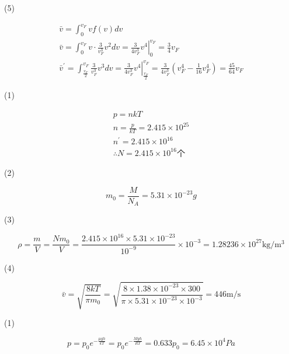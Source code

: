 \documentclass[b5paper,opensource]{./template/qyxf-book}
\begin{document}
(5)

$$
\begin{array} { c } { \bar { v } = \int _ { 0 } ^ { v _ { F } } v f ( v ) d v } \\ { \bar { v } = \int _ { 0 } ^ { v _ { F } } v \cdot \frac { 3 } { v _ { F } ^ { 3 } } v ^ { 2 } d v = \left. \frac { 3 } { 4 v _ { F } ^ { 3 } } v ^ { 4 } \right| _ { 0 } ^ { v _ { F } } = \frac { 3 } { 4 } v _ { F } } \\ { \bar { v } ^ { \prime } = \int _ { \frac { v _ { F } } { 2 } } ^ { v _ { F } } \frac { 3 } { v _ { F } ^ { 3 } } v ^ { 3 } d v = \left. \frac { 3 } { 4 v _ { F } ^ { 3 } } v ^ { 4 } \right| _ { \frac { v _ { F } } { 2 } } ^ { v _ { F } } = \frac { 3 } { 4 v _ { F } ^ { 3 } } \left( v _ { F } ^ { 4 } - \frac { 1 } { 16 } v _ { F } ^ { 4 } \right) = \frac { 45 } { 64 } v _ { F } } \end{array}
$$


\solve
(1)

$$
\begin{array} { c } { p = n k T } \\ { n = \frac { p } { k T } = 2.415 \times 10 ^ { 25 } } \\ { n ^ { \prime } = 2.415 \times 10 ^ { 16 } } \\ { \therefore N = 2.415 \times 10 ^ { 16 } \mbox{个} } \end{array}
$$

(2)

$$
m _ { 0 } = \frac { M } { N _ { A } } = 5.31 \times 10 ^ { - 23 } g
$$

(3)

$$
\rho = \frac { m } { V } = \frac { N m _ { 0 } } { V } = \frac { 2.415 \times 10 ^ { 16 } \times 5.31 \times 10 ^ { - 23 } } { 10 ^ { - 9 } } \times 10 ^ { - 3 } = 1.28236 \times 10 ^ { 27 } \mathrm { kg } / \mathrm { m } ^ { 3 }
$$

(4)

$$
\bar { v } = \sqrt { \frac { 8 k T } { \pi m _ { 0 } } } = \sqrt { \frac { 8 \times 1.38 \times 10 ^ { - 23 } \times 300 } { \pi \times 5.31 \times 10 ^ { - 23 } \times 10 ^ { - 3 } } } = 446 \mathrm { m } / \mathrm { s }
$$



\solve

(1)

$$
p = p _ { 0 } e ^ { - \frac { \mu g h } { k T } } = p _ { 0 } e ^ { - \frac { M g h } { R T } } = 0.633 p _ { 0 } = 6.45 \times 10 ^ { 4 } P a
$$
\end{document}
